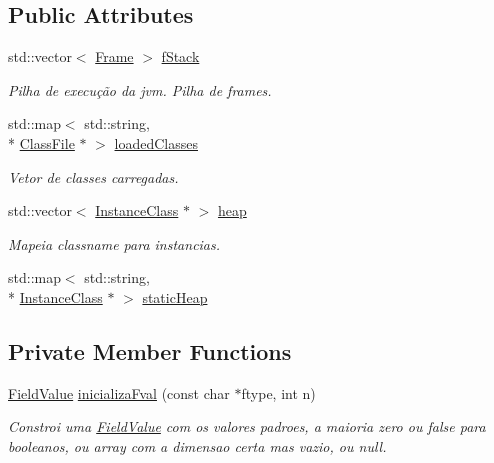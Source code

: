 \subsection*{Public Attributes}
\begin{DoxyCompactItemize}
\item 
std\+::vector$<$ \hyperlink{classFrame}{Frame} $>$ \hyperlink{classJvm_ab19406aec3e97ade3d4efbd5796c36f3}{f\+Stack}
\begin{DoxyCompactList}\small\item\em Pilha de execução da jvm. Pilha de frames. \end{DoxyCompactList}\item 
std\+::map$<$ std\+::string, \\*
\hyperlink{classClassFile}{Class\+File} $\ast$ $>$ \hyperlink{classJvm_ac74fb0e170f232ddc32244a1ce7746b7}{loaded\+Classes}
\begin{DoxyCompactList}\small\item\em Vetor de classes carregadas. \end{DoxyCompactList}\item 
std\+::vector$<$ \hyperlink{classInstanceClass}{Instance\+Class} $\ast$ $>$ \hyperlink{classJvm_ac0054a4d92e17e2a3ad01f9fe32bb096}{heap}
\begin{DoxyCompactList}\small\item\em Mapeia classname para instancias. \end{DoxyCompactList}\item 
std\+::map$<$ std\+::string, \\*
\hyperlink{classInstanceClass}{Instance\+Class} $\ast$ $>$ \hyperlink{classJvm_a8852d50533c03dabd4320c27e92d4f1b}{static\+Heap}
\end{DoxyCompactItemize}
\subsection*{Private Member Functions}
\begin{DoxyCompactItemize}
\item 
\hyperlink{classFieldValue}{Field\+Value} \hyperlink{classJvm_a2c1ac5823895df859f9effc95b84d9b0}{inicializa\+Fval} (const char $\ast$ftype, int n)
\begin{DoxyCompactList}\small\item\em Constroi uma \hyperlink{classFieldValue}{Field\+Value} com os valores padroes, a maioria zero ou false para booleanos, ou array com a dimensao certa mas vazio, ou null. \end{DoxyCompactList}\end{DoxyCompactItemize}


